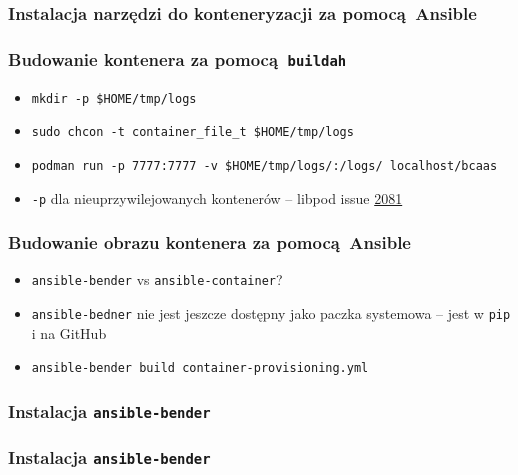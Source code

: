 \documentclass[dvipsnames,table]{beamer}
\begin{document}
\begin{frame}[fragile]
	\frametitle{Instalacja narzędzi do konteneryzacji za pomocą Ansible}
%	
\end{frame}

\begin{frame}[fragile]
	\frametitle{Budowanie kontenera za pomocą {\tt buildah}}
%
\begin{itemize}
	\item {\tt mkdir -p \$HOME/tmp/logs}
	\item {\tt sudo chcon -t container\_file\_t \$HOME/tmp/logs}
	\item {\tt podman run -p 7777:7777 -v \$HOME/tmp/logs/:/logs/ localhost/bcaas}
	\item {\tt -p} dla nieuprzywilejowanych kontenerów -- libpod issue \href{https://github.com/containers/libpod/issues/2081}{2081}
\end{itemize}
\end{frame}

\begin{frame}[fragile]
	\frametitle{Budowanie obrazu kontenera za pomocą Ansible}
%	
\begin{itemize}
	\item {\tt ansible-bender} vs {\tt ansible-container}?
	\item {\tt ansible-bedner} nie jest jeszcze dostępny jako paczka systemowa -- jest w {\tt pip} i na GitHub
	\item {\tt ansible-bender build container-provisioning.yml}
\end{itemize}
\end{frame}

\begin{frame}[fragile]
	\frametitle{Instalacja {\tt ansible-bender}}
\begin{center}
\end{center}
%
\end{frame}

\begin{frame}[fragile]
	\frametitle{Instalacja {\tt ansible-bender}}
%
\end{frame}
\end{document}
